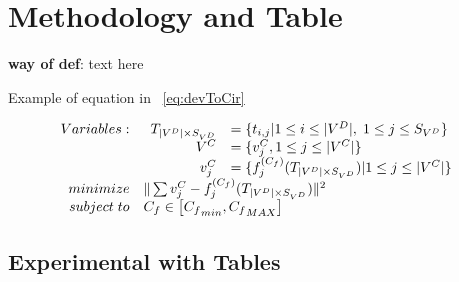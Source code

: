
\chapter{Methodology and Table}\label{chap:Method}
      
        
  \begin{defi}
    {\bf way of def}: text here
  \end{defi}

  Example of equation in ~\ref{eq:devToCir}

  \begin{align}\label{eq:devToCir}
    \begin{array}[t]{rl}
      Variables: & \begin{array}[t]{rl}
                    T_{|V^D| \times S_{V^D}}  & = \{t_{i,j}| 1 \leq i \leq |V^D|,\; 1 \leq j \leq S_{V^D}\}   \\
                    V^C   &= \{v_j^C, 1\leq j \leq |V^C| \}   \\
                    v_j^C &= \{f_j^{(C_f)}(T_{|V^D| \times S_{V^D}})|1 \leq j \leq |V^C|\}  \\
                  \end{array} \\
       minimize & \| \sum{ v_j^C - f_j^{(C_f)}(T_{|V^D| \times S_{V^D}})}\|^2   \\
     subject\; to & C_f\in \left [{C_f}_{min}, {C_f}_{MAX} \right] 
    \end{array} 
  \end{align}


  \section{Experimental with Tables}\label{sec:PAGEExp}
    
